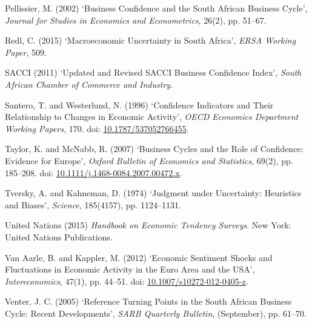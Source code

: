\documentclass[11pt,]{article}
\begin{document}
\hypertarget{ref-Pellissier2002}{}
Pellissier, M. (2002) `Business Confidence and the South African
Business Cycle', \emph{Journal for Studies in Economics and
Econometrics}, 26(2), pp. 51--67.

\hypertarget{ref-Redl2015}{}
Redl, C. (2015) `Macroeconomic Uncertainty in South Africa', \emph{ERSA
Working Paper}, 509.

\hypertarget{ref-SACCI2011}{}
SACCI (2011) `Updated and Revised SACCI Business Confidence Index',
\emph{South African Chamber of Commerce and Industry}.

\hypertarget{ref-Santero1996}{}
Santero, T. and Westerlund, N. (1996) `Confidence Indicators and Their
Relationship to Changes in Economic Activity', \emph{OECD Economics
Department Working Papers}, 170. doi:
\href{https://doi.org/10.1787/537052766455}{10.1787/537052766455}.

\hypertarget{ref-Taylor2007}{}
Taylor, K. and McNabb, R. (2007) `Business Cycles and the Role of
Confidence: Evidence for Europe', \emph{Oxford Bulletin of Economics and
Statistics}, 69(2), pp. 185--208. doi:
\href{https://doi.org/10.1111/j.1468-0084.2007.00472.x}{10.1111/j.1468-0084.2007.00472.x}.

\hypertarget{ref-Tversky1974}{}
Tversky, A. and Kahneman, D. (1974) `Judgment under Uncertainty:
Heuristics and Biases', \emph{Science}, 185(4157), pp. 1124--1131.

\hypertarget{ref-UN2015}{}
United Nations (2015) \emph{Handbook on Economic Tendency Surveys}. New
York: United Nations Publications.

\hypertarget{ref-VanAarle2012}{}
Van Aarle, B. and Kappler, M. (2012) `Economic Sentiment Shocks and
Fluctuations in Economic Activity in the Euro Area and the USA',
\emph{Intereconomics}, 47(1), pp. 44--51. doi:
\href{https://doi.org/10.1007/s10272-012-0405-z}{10.1007/s10272-012-0405-z}.

\hypertarget{ref-Venter2005a}{}
Venter, J. C. (2005) `Reference Turning Points in the South African
Business Cycle: Recent Developments', \emph{SARB Quarterly Bulletin},
(September), pp. 61--70.
\end{document}
